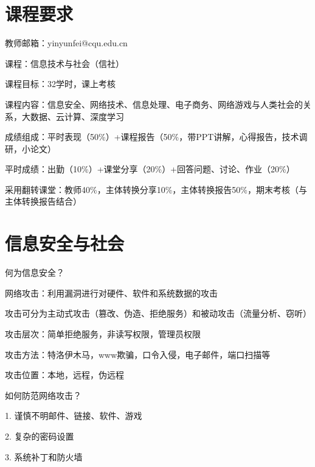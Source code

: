 \def\lecturer{尹云飞}
\def\noter{THF}
\def\className{Computer Science Technology and Society}
\def\term{III-B}



\maketitle
\tableofcontents
\section*{课程要求}%
\label{sec:课程要求}
教师邮箱：yinyunfei@cqu.edu.cn

课程：信息技术与社会（信社）

课程目标：32学时，课上考核

课程内容：信息安全、网络技术、信息处理、电子商务、网络游戏与人类社会的关系，大数据、云计算、深度学习

成绩组成：平时表现（50\%）+课程报告（50\%，带PPT讲解，心得报告，技术调研，小论文）

平时成绩：出勤（10\%）+课堂分享（20\%）+回答问题、讨论、作业（20\%）

采用翻转课堂：教师40\%，主体转换分享10\%，主体转换报告50\%，期末考核（与主体转换报告结合）

\section{信息安全与社会}%
\label{sec:信息安全与社会}
\begin{question}
    何为信息安全？
\end{question}
\begin{notation}
    网络攻击：利用漏洞进行对硬件、软件和系统数据的攻击
\end{notation}
攻击可分为主动式攻击（篡改、伪造、拒绝服务）和被动攻击（流量分析、窃听）

攻击层次：简单拒绝服务，非读写权限，管理员权限

攻击方法：特洛伊木马，www欺骗，口令入侵，电子邮件，端口扫描等

攻击位置：本地，远程，伪远程
\begin{question}
    如何防范网络攻击？
\end{question}
1. 谨慎不明邮件、链接、软件、游戏

2. 复杂的密码设置

3. 系统补丁和防火墙

